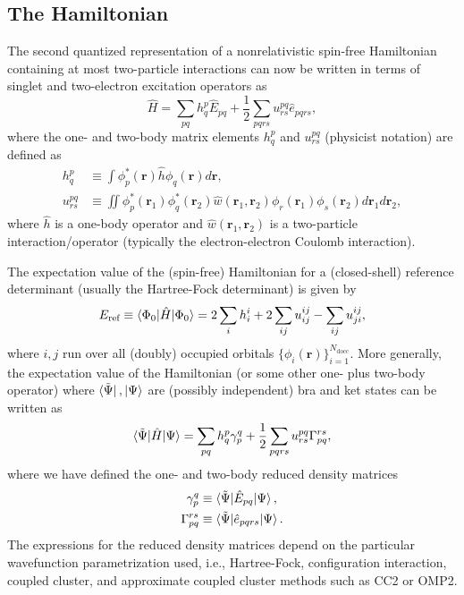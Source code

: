 \documentclass{article}
\begin{document}
\subsection{The Hamiltonian}
The second quantized representation of a nonrelativistic spin-free Hamiltonian containing at most two-particle interactions can now be written in terms of singlet and two-electron excitation operators as
\begin{equation}
    \hat{H} = \sum_{pq}h^p_q \hat{E}_{pq} + \frac{1}{2} \sum_{pqrs} u^{pq}_{rs} \hat{e}_{pqrs} \label{eq:spin_free_Hamiltonian},
\end{equation}
where the one- and two-body matrix elements $h^p_q$ and $u^{pq}_{rs}$ (physicist notation) are defined as 
\begin{align}
    h^p_q &\equiv \int \phi_p^*(\mathbf{r}) \hat{h} \phi_q(\mathbf{r}) d\mathbf{r}, \\
    u^{pq}_{rs} &\equiv \iint \phi_p^*(\mathbf{r}_1) \phi_q^*(\mathbf{r}_2) \hat{w}(\mathbf{r}_1, \mathbf{r}_2) \phi_r(\mathbf{r}_1) \phi_s(\mathbf{r}_2) d\mathbf{r}_1 d\mathbf{r}_2,  
\end{align}
where $\hat{h}$ is a one-body operator and $\hat{w}(\mathbf{r}_1, \mathbf{r}_2)$ is a two-particle interaction/operator (typically the electron-electron Coulomb interaction).

The expectation value of the (spin-free) Hamiltonian for a (closed-shell) reference determinant (usually the Hartree-Fock determinant) is given by
\begin{align}
    E_{\text{ref}} \equiv \braket{\Phi_0|\hat{H}|\Phi_0} = 2\sum_{i} h^i_i + 2\sum_{ij} u^{ij}_{ij}-\sum_{ij} u^{ij}_{ji},
\end{align}
where $i,j$ run over all (doubly) occupied orbitals $\{ \phi_i(\mathbf{r}) \}_{i=1}^{N_{\text{docc}}}$. More generally, the expectation value of the Hamiltonian (or some other one- plus two-body operator) where $\bra{\tilde{\Psi}}, \ket{\Psi}$ are (possibly independent) bra and ket states can be written as
\begin{equation}
    \braket{\tilde{\Psi}|\hat{H}|\Psi} = \sum_{pq} h^p_q \gamma^q_p + \frac{1}{2} \sum_{pqrs} u^{pq}_{rs} \Gamma_{pq}^{rs},
\end{equation}
where we have defined the one- and two-body reduced density matrices
\begin{align}
    \gamma^q_p &\equiv \braket{\tilde{\Psi}|\hat{E}_{pq}|\Psi}, \\
    \Gamma^{rs}_{pq} &\equiv \braket{\tilde{\Psi}|\hat{e}_{pqrs}|\Psi}.
\end{align}
The expressions for the reduced density matrices depend on the particular wavefunction parametrization used, i.e., Hartree-Fock, configuration interaction, coupled cluster, and approximate coupled cluster methods such as CC2 or OMP2.
\end{document}
